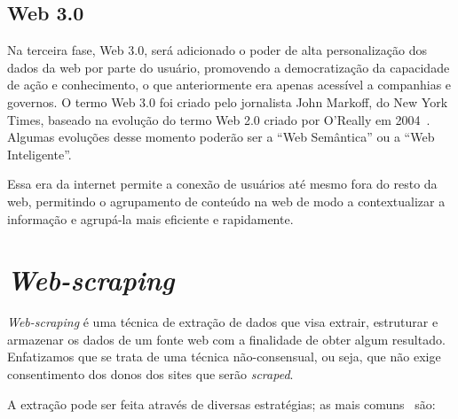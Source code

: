 \subsection{Web 3.0}

Na terceira fase, Web 3.0, será adicionado o poder de alta personalização dos dados da web por parte do usuário, promovendo a democratização da capacidade de ação e conhecimento, o que anteriormente era apenas acessível a companhias e governos.
O termo Web 3.0 foi criado pelo jornalista John Markoff, do New York Times, baseado na evolução do termo Web 2.0 criado por O’Really em 2004~\cite{Web32}. Algumas evoluções desse momento poderão ser a ``Web Semântica'' ou a ``Web Inteligente''.

Essa era da internet permite a conexão de usuários até mesmo fora do resto da web, permitindo o agrupamento de conteúdo na web de modo a contextualizar a informação e agrupá-la mais eficiente e rapidamente.

\section{\textit{Web-scraping}}

\textit{Web-scraping} é uma técnica de extração de dados que visa extrair, estruturar e armazenar os dados de um fonte web com a finalidade de obter algum resultado.
Enfatizamos que se trata de uma técnica não-consensual, ou seja, que não exige consentimento dos donos dos sites que serão \textit{scraped}.

A extração pode ser feita através de diversas estratégias; as mais comuns~\cite{Scraping1} são:

